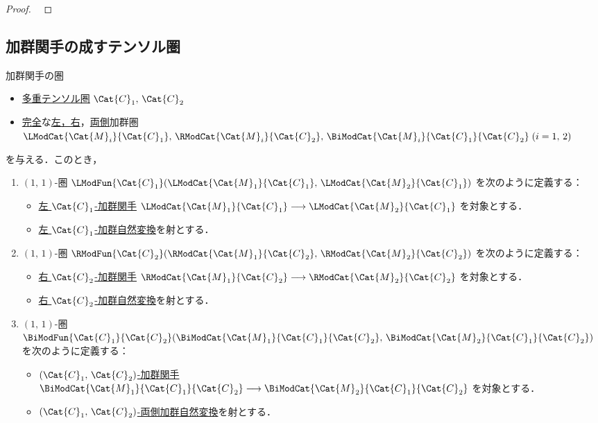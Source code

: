 \documentclass[TQFT_main]{subfiles}
\begin{document}
\begin{proof}
    ~\cite[PROPOSITION 7.6.7.]{etingof2015tensor}
\end{proof}

\subsection{加群関手の成すテンソル圏}

\begin{mydef}[label=def:module-Fun,breakable]{加群関手の圏}
    \begin{itemize}
        \item \hyperref[def:tensorfusion-cat]{多重テンソル圏} $\Cat{C}_1,\, \Cat{C}_2$
        \item \hyperref[def:modulecat-exact]{完全}な\hyperref[def:modulecat]{左，右}，\hyperref[def:bimodulecat]{両側}加群圏 $\LModCat{\Cat{M}_i}{\Cat{C}_1},\, \RModCat{\Cat{M}_i}{\Cat{C}_2},\, \BiModCat{\Cat{M}_i}{\Cat{C}_1}{\Cat{C}_2}\; (i=1,\, 2)$
    \end{itemize}
    を与える．このとき，
    \begin{enumerate}
        \item $(1,\, 1)$-圏 $\LModFun{\Cat{C}_1} (\LModCat{\Cat{M}_1}{\Cat{C}_1},\, \LModCat{\Cat{M}_2}{\Cat{C}_1})$ を次のように定義する：
        \begin{itemize}
            \item \hyperref[def:module-functor]{左 $\Cat{C}_1$-加群関手} $\LModCat{\Cat{M}_1}{\Cat{C}_1} \lto \LModCat{\Cat{M}_2}{\Cat{C}_1}$ を対象とする．
            \item \hyperref[def:module-functor]{左 $\Cat{C}_1$-加群自然変換}を射とする．
        \end{itemize}

        \item $(1,\, 1)$-圏 $\RModFun{\Cat{C}_2} (\RModCat{\Cat{M}_1}{\Cat{C}_2},\, \RModCat{\Cat{M}_2}{\Cat{C}_2})$ を次のように定義する：
        \begin{itemize}
            \item \hyperref[def:module-functor]{右 $\Cat{C}_2$-加群関手} $\RModCat{\Cat{M}_1}{\Cat{C}_2} \lto \RModCat{\Cat{M}_2}{\Cat{C}_2}$ を対象とする．
            \item \hyperref[def:module-functor]{右 $\Cat{C}_2$-加群自然変換}を射とする．
        \end{itemize}

        \item $(1,\, 1)$-圏 $\BiModFun{\Cat{C}_1}{\Cat{C}_2} (\BiModCat{\Cat{M}_1}{\Cat{C}_1}{\Cat{C}_2},\, \BiModCat{\Cat{M}_2}{\Cat{C}_1}{\Cat{C}_2})$ を次のように定義する：
        \begin{itemize}
            \item \hyperref[def:bimod-functor]{$(\Cat{C}_1,\, \Cat{C}_2)$-加群関手} $\BiModCat{\Cat{M}_1}{\Cat{C}_1}{\Cat{C}_2} \lto \BiModCat{\Cat{M}_2}{\Cat{C}_1}{\Cat{C}_2}$ を対象とする．
            \item \hyperref[def:module-functor]{$(\Cat{C}_1,\, \Cat{C}_2)$-両側加群自然変換}を射とする．
        \end{itemize}
    \end{enumerate}
\end{mydef}
\end{document}
